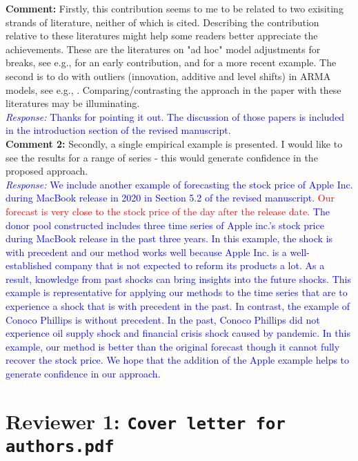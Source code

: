 \documentclass[12pt]{article}
\newcommand{\response}[1]{\noindent \textcolor{blue}{\emph{Response:} #1}}
\begin{document}
{\bf Comment:} Firstly, this contribution seems to me to be related to two exisiting strands of literature, neither of which is cited. Describing the contribution relative to these literatures might help some readers better appreciate the achievements.
These are the literatures on "ad hoc" model adjustments for breaks, see e.g.,  \cite{clements1996intercept} for an early contribution, and \cite{castle2015robust} for a more recent example. The second is to do with outliers (innovation, additive and level shifts) in ARMA models, see e.g., \cite{tsay1986time}. Comparing/contrasting the approach in the paper with these literatures may be illuminating. \\

\response{Thanks for pointing it out. The discussion of those papers is included in the introduction section of the revised manuscript.}\\

{\bf Comment 2:} Secondly, a single empirical example is presented. I would like to see the results for a range of series - this would generate confidence in the proposed approach. \\

\response{We include another example of forecasting the stock price of Apple Inc. during MacBook release in 2020 in Section 5.2 of the revised manuscript. \textcolor{red}{Our forecast is very close to the stock price of the day after the release date.} The donor pool constructed includes three time series of  Apple inc.'s stock price during MacBook release in the past three years. In this example, the shock is with precedent and our method works well because Apple Inc. is a well-established company that is not expected to reform its products a lot. As a result, knowledge from past shocks can bring insights into the future shocks. This example is representative for applying our methods to the time series that are to experience a shock that is with precedent in the past. In contrast, the example of Conoco Phillips is without precedent. In the past, Conoco Phillips  did not experience oil supply shock and financial crisis shock caused by  pandemic. In this example, our method is better than the original forecast though it cannot fully recover the stock price. We hope that the addition of the Apple example helps to generate confidence in our approach.}

\newpage
\section*{Reviewer 1: \texttt{Cover letter for authors.pdf}}
\end{document}
